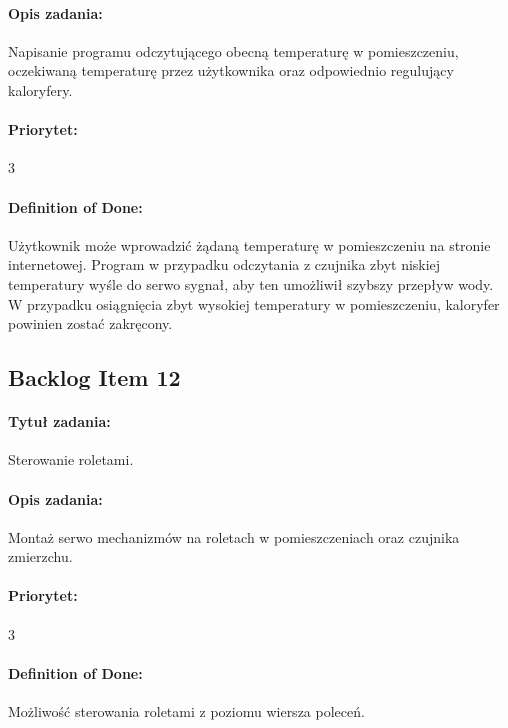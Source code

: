 \paragraph{Opis zadania:} 
Napisanie programu odczytującego obecną temperaturę w pomieszczeniu, oczekiwaną temperaturę przez użytkownika oraz odpowiednio regulujący kaloryfery.

\paragraph{Priorytet:}
3

\paragraph{Definition of Done:} 
Użytkownik może wprowadzić żądaną temperaturę w pomieszczeniu na stronie internetowej. Program w przypadku odczytania z czujnika zbyt niskiej temperatury wyśle do serwo sygnał, aby ten umożliwił szybszy przepływ wody. W przypadku osiągnięcia zbyt wysokiej temperatury w pomieszczeniu, kaloryfer powinien zostać zakręcony. 


	
	\subsection{Backlog Item 12}
	\paragraph{Tytuł zadania:}
	Sterowanie roletami.
	
	\paragraph{Opis zadania:} 
	Montaż serwo mechanizmów na roletach w pomieszczeniach oraz czujnika zmierzchu.
	
	\paragraph{Priorytet:}
	3
	
	\paragraph{Definition of Done:}
	Możliwość sterowania roletami z poziomu wiersza poleceń.



